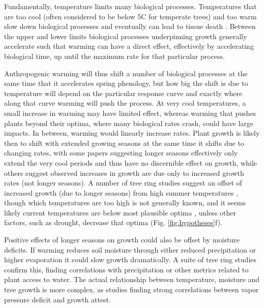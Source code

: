 \documentclass[11pt]{article}
\begin{document}
Fundamentally, temperature limits many biological processes. Temperatures that are too cool (often considered to be below 5\degree C for temperate trees) and too warm \citep[an area of active research,][see also Fig. \ref{fig:temperaturecomplex}]{martinez2008hot,cabon2022cross} slow down biological processes and eventually can lead to tissue death \citep{larcher1980,kramer2012book}. Between the upper and lower limits biological processes underpinning growth generally accelerate such that warming can have a direct effect, effectively by accelerating biological time, up until the maximum rate for that particular process.

Anthropogenic warming will thus shift a number of biological processes at the same time that it accelerates spring phenology, but how big the shift is due to temperature will depend on the particular response curve and exactly where along that curve warming will push the process. At very cool temperatures, a small increase in warming may have limited effect, whereas warming that pushes plants beyond their optima, where many biological rates crash, could have large impacts. In between, warming would linearly increase rates. Plant growth is likely then to shift with extended growing seasons at the same time it shifts due to changing rates, with some papers suggesting longer seasons effectively only extend the very cool periods and thus have no discernible effect on growth, while others suggest observed increases in growth are due only to increased growth rates (not longer seasons). A number of tree ring studies suggest an offset of increased growth (due to longer seasons) from high summer temperatures \citep{gantois2022new,dow2022warm}, though which temperatures are too high is not generally known, and it seems likely current temperatures are below most plausible optima \citep{schaber2002evaluation}, unless other factors, such as drought, decrease that optima (Fig. \ref{fig:hypotheses}f). 

Positive effects of longer seasons on growth could also be offset by moisture deficits. If warming reduces soil moisture through either reduced precipitation or higher evaporation it could slow growth dramatically. A suite of tree ring studies confirm this, finding correlations with precipitation or other metrics related to plant access to water. The actual relationship between temperature, moisture and tree growth is more complex, as studies finding strong correlations between vapor pressure deficit and growth attest. 
\end{document}
